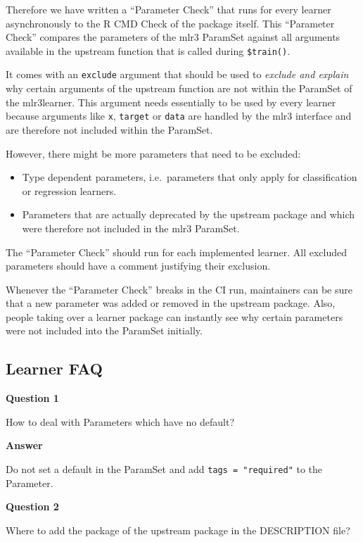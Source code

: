\documentclass[]{scrbook}
\providecommand{\tightlist}{%
  \setlength{\itemsep}{0pt}\setlength{\parskip}{0pt}}
\begin{document}
Therefore we have written a ``Parameter Check'' that runs for every learner asynchronously to the R CMD Check of the package itself.
This ``Parameter Check'' compares the parameters of the mlr3 ParamSet against all arguments available in the upstream function that is called during \texttt{\$train()}.

It comes with an \texttt{exclude} argument that should be used to \emph{exclude and explain} why certain arguments of the upstream function are not within the ParamSet of the mlr3learner.
This argument needs essentially to be used by every learner because arguments like \texttt{x}, \texttt{target} or \texttt{data} are handled by the mlr3 interface and are therefore not included within the ParamSet.

However, there might be more parameters that need to be excluded:

\begin{itemize}
\tightlist
\item
  Type dependent parameters, i.e.~parameters that only apply for classification or regression learners.
\item
  Parameters that are actually deprecated by the upstream package and which were therefore not included in the mlr3 ParamSet.
\end{itemize}

The ``Parameter Check'' should run for each implemented learner.
All excluded parameters should have a comment justifying their exclusion.

Whenever the ``Parameter Check'' breaks in the CI run, maintainers can be sure that a new parameter was added or removed in the upstream package.
Also, people taking over a learner package can instantly see why certain parameters were not included into the ParamSet initially.

\hypertarget{learner-faq}{%
\subsection{Learner FAQ}\label{learner-faq}}

\textbf{Question 1}

How to deal with Parameters which have no default?

\textbf{Answer}

Do not set a default in the ParamSet and add \texttt{tags\ =\ "required"} to the Parameter.

\textbf{Question 2}

Where to add the package of the upstream package in the DESCRIPTION file?
\end{document}
